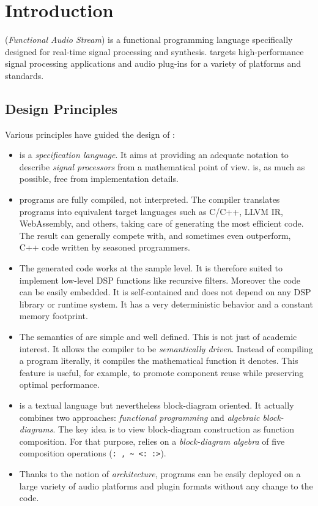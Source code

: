 \chapter{Introduction}
\label{introduction}


\faust (\textit{Functional Audio Stream}) is a functional programming language specifically designed for real-time signal processing and synthesis.  \faust targets high-performance signal processing applications and audio plug-ins for a variety of platforms and standards. 

\section{Design Principles} 

Various principles have guided the design of \faust :

\begin{itemize}

\item \faust is a \textit{specification language}. It aims at providing an adequate notation to describe \textit{signal processors} from a mathematical point of view. \faust is, as much as possible, free from implementation details. 

\item \faust programs are fully compiled, not interpreted. The compiler translates \faust programs into equivalent target languages such as C/C++, LLVM IR, WebAssembly, and others, taking care of generating the most efficient code. The result can generally compete with, and sometimes even outperform, C++ code written by seasoned programmers.

\item The generated code works at the sample level. It is therefore suited to implement low-level DSP functions like recursive filters. Moreover the code can be easily embedded. It is self-contained and does not depend on any DSP library or runtime system. It has a very deterministic behavior and a constant memory footprint. 

\item The semantics of \faust are simple and well defined. This is not just of academic interest. It allows the \faust compiler to be \emph{semantically driven}. Instead of compiling a program literally, it compiles the mathematical function it denotes. This feature is useful, for example, to promote component reuse while preserving optimal performance.  

\item \faust is a textual language but nevertheless block-diagram oriented. It actually combines two approaches: \textit{functional programming} and \textit{algebraic block-diagrams}. The key idea is to view block-diagram construction as function composition. For that purpose, \faust relies on a \emph{block-diagram algebra} of five composition operations (\lstinline': , ~ <: :>').

\item Thanks to the notion of \textit{architecture}, \faust programs can be easily deployed on a large variety of audio platforms and plugin formats without any change to the \faust code.

\end{itemize}

